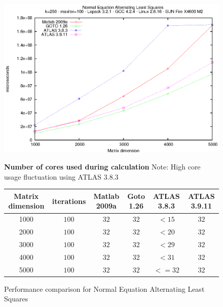 \documentclass[a4paper,10pt]{scrartcl}
\begin{document}
	\begin{figure}
		\label{Figure3}	
		\includegraphics{nmf_neals.eps}\newline

		
		\textbf{Number of cores used during calculation}\newline
		Note: High core usage fluctuation using ATLAS 3.8.3\newline

		\begin{tabular}{|c|c|c|c|c|c|}
			\hline
			Matrix dimension & iterations & Matlab 2009a & Goto 1.26 & ATLAS 3.8.3 & ATLAS 3.9.11\\
			\hline
			1000 & $100$ & $32$ & $32$ & $<15$ & $32$\\
			2000 & $100$ & $32$ & $32$ & $<20$ & $32$ \\
			3000 & $100$ & $32$ & $32$ & $<29$ & $32$\\
			4000 & $100$ & $32$ & $32$ & $<31$ & $32$\\
			5000 & $100$ & $32$ & $32$ & $<=32$ & $32$\\
			\hline
		\end{tabular}
		\caption{Performance comparison for Normal Equation Alternating Least Squares}
	\end{figure}
\end{document}
